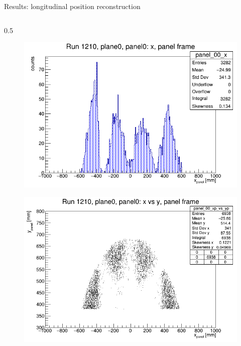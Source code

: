 \documentclass{beamer}[10pt]
\begin{document}
\begin{frame}{Results: longitudinal position reconstruction}
  \vspace{-3mm}
  \begin{columns}
    \begin{column}{0.5\framewidth}
      \begin{figure}[H]
        \centering
        \includegraphics[width= \textwidth]{figures/pdf/x_panel0.png}
        \label{fig:enter-label}
    \end{figure}
    \vspace{-12mm}
    \begin{figure}[H]
      \centering
      \includegraphics[width=  \textwidth]{figures/pdf/xp_vs_yp_panel0.png}
      \label{fig:enter-label}
  \end{figure}
     

\end{column}
\end{columns}
\end{frame}
\end{document}
